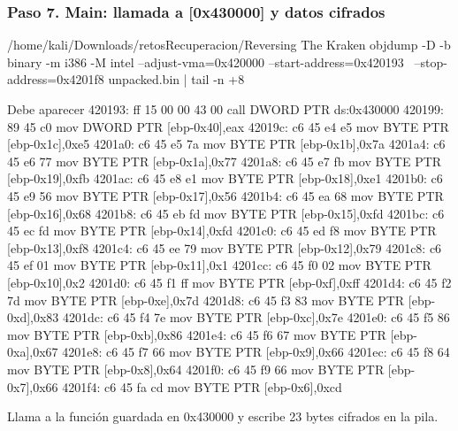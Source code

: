 \documentclass[11pt,a4paper]{article}
\begin{document}
\subsubsection*{Paso 7. Main: llamada a [0x430000] y datos cifrados}
\begin{comando}{/home/kali/Downloads/retosRecuperacion/Reversing The Kraken}
objdump -D -b binary -m i386 -M intel --adjust-vma=0x420000 --start-address=0x420193 \
  --stop-address=0x4201f8 unpacked.bin | tail -n +8
\end{comando}
\begin{salida}{Debe aparecer}
  420193:       ff 15 00 00 43 00       call   DWORD PTR ds:0x430000
  420199:       89 45 c0                mov    DWORD PTR [ebp-0x40],eax
  42019c:       c6 45 e4 e5             mov    BYTE PTR [ebp-0x1c],0xe5
  4201a0:       c6 45 e5 7a             mov    BYTE PTR [ebp-0x1b],0x7a
  4201a4:       c6 45 e6 77             mov    BYTE PTR [ebp-0x1a],0x77
  4201a8:       c6 45 e7 fb             mov    BYTE PTR [ebp-0x19],0xfb
  4201ac:       c6 45 e8 e1             mov    BYTE PTR [ebp-0x18],0xe1
  4201b0:       c6 45 e9 56             mov    BYTE PTR [ebp-0x17],0x56
  4201b4:       c6 45 ea 68             mov    BYTE PTR [ebp-0x16],0x68
  4201b8:       c6 45 eb fd             mov    BYTE PTR [ebp-0x15],0xfd
  4201bc:       c6 45 ec fd             mov    BYTE PTR [ebp-0x14],0xfd
  4201c0:       c6 45 ed f8             mov    BYTE PTR [ebp-0x13],0xf8
  4201c4:       c6 45 ee 79             mov    BYTE PTR [ebp-0x12],0x79
  4201c8:       c6 45 ef 01             mov    BYTE PTR [ebp-0x11],0x1
  4201cc:       c6 45 f0 02             mov    BYTE PTR [ebp-0x10],0x2
  4201d0:       c6 45 f1 ff             mov    BYTE PTR [ebp-0xf],0xff
  4201d4:       c6 45 f2 7d             mov    BYTE PTR [ebp-0xe],0x7d
  4201d8:       c6 45 f3 83             mov    BYTE PTR [ebp-0xd],0x83
  4201dc:       c6 45 f4 7e             mov    BYTE PTR [ebp-0xc],0x7e
  4201e0:       c6 45 f5 86             mov    BYTE PTR [ebp-0xb],0x86
  4201e4:       c6 45 f6 67             mov    BYTE PTR [ebp-0xa],0x67
  4201e8:       c6 45 f7 66             mov    BYTE PTR [ebp-0x9],0x66
  4201ec:       c6 45 f8 64             mov    BYTE PTR [ebp-0x8],0x64
  4201f0:       c6 45 f9 66             mov    BYTE PTR [ebp-0x7],0x66
  4201f4:       c6 45 fa cd             mov    BYTE PTR [ebp-0x6],0xcd
\end{salida}
\begin{nota}Llama a la función guardada en 0x430000 y escribe 23 bytes cifrados en la pila.\end{nota}
\end{document}
